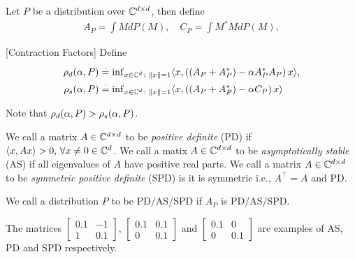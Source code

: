 \begin{definition}
Let $P$ be a distribution over $\mathbb{C}^{d \times d}$, then define
\begin{align*}
A_P=\int M dP(M),\quad C_P=\int M^* M dP(M),
\end{align*}
\end{definition}
\begin{definition}\label{def:contract}[Contraction Factors]
Define
\begin{align*}
\rho_d(\alpha,P)&\stackrel{\cdot}{=} {\inf}_{x\in\mathbb{C}^d\colon\left\| x\right\|=1}\langle x,\left((A_P+A_P^*)-\alpha A_P^* A_P\right)x\rangle,\\ \rho_s(\alpha,P)&\stackrel{\cdot}{=}{\inf}_{x\in \mathbb{C}^d\colon\left\| x\right\|=1}\langle x,\left((A_P+A_P^*)-\alpha C_P\right)x\rangle
\end{align*}
\end{definition}
Note that $\rho_d(\alpha,P)>\rho_s(\alpha,P)$.

\begin{definition}
We call a matrix $A\in \mathbb{C}^{d \times d}$ to be \emph{positive definite} (PD) if $\langle x,Ax\rangle >0,\,\forall x\neq 0 \in \mathbb{C}^{d}$. We call a matix $A\in \mathbb{C}^{d \times d}$ to be \emph{asymptotically stable} (AS) if all eigenvalues of $A$ have positive real parts. We call a matrix $A\in \mathbb{C}^{d \times d}$ to be \emph{symmetric positive definite} (SPD) is it is symmetric i.e., $A^\top=A$ and PD.
\end{definition}
\begin{definition}\label{distpd}
We call a distribution $P$ to be PD/AS/SPD if $A_P$ is PD/AS/SPD.
\end{definition}
\begin{example}
The matrices $\begin{bmatrix}0.1 &-1\\ 1 & 0.1\end{bmatrix}$, $\begin{bmatrix} 0.1 & 0.1 \\ 0 & 0.1\end{bmatrix}$ and $\begin{bmatrix}0.1 &0 \\ 0 & 0.1\end{bmatrix}$ are examples of AS, PD and SPD respectively.
\end{example}

